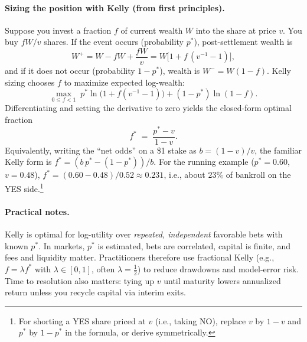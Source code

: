 \paragraph{Sizing the position with Kelly (from first principles).}
Suppose you invest a fraction $f$ of current wealth $W$ into the share at price $v$. You buy $fW/v$ shares. If the event occurs (probability $p^*$), post-settlement wealth is
\[
W^+=W - fW + \frac{fW}{v}=W\bigl[1 + f\,(v^{-1}-1)\bigr],
\]
and if it does not occur (probability $1-p^*$), wealth is $W^-=W(1-f)$. Kelly sizing chooses $f$ to maximize expected log-wealth:
\[
\max_{0\le f<1}\; p^* \ln\!\bigl(1+ f(v^{-1}-1)\bigr) + (1-p^*)\ln(1-f).
\]
Differentiating and setting the derivative to zero yields the closed-form optimal fraction
\[
f^* \;=\; \frac{p^*-v}{1-v}.
\]
Equivalently, writing the “net odds” on a \$1 stake as $b=(1-v)/v$, the familiar Kelly form is $f^*=(b\,p^*-(1-p^*))/b$. For the running example ($p^*=0.60$, $v=0.48$), $f^*\!=\!(0.60-0.48)/0.52\approx 0.231$, i.e., about $23\%$ of bankroll on the YES side.\footnote{For shorting a YES share priced at $v$ (i.e., taking NO), replace $v$ by $1-v$ and $p^*$ by $1-p^*$ in the formula, or derive symmetrically.}

\paragraph{Practical notes.}
Kelly is optimal for log-utility over \emph{repeated, independent} favorable bets with known $p^*$. In markets, $p^*$ is estimated, bets are correlated, capital is finite, and fees and liquidity matter. Practitioners therefore use fractional Kelly (e.g., $f=\lambda f^*$ with $\lambda\in[0,1]$, often $\lambda=\tfrac{1}{2}$) to reduce drawdowns and model-error risk. Time to resolution also matters: tying up $v$ until maturity lowers annualized return unless you recycle capital via interim exits.
